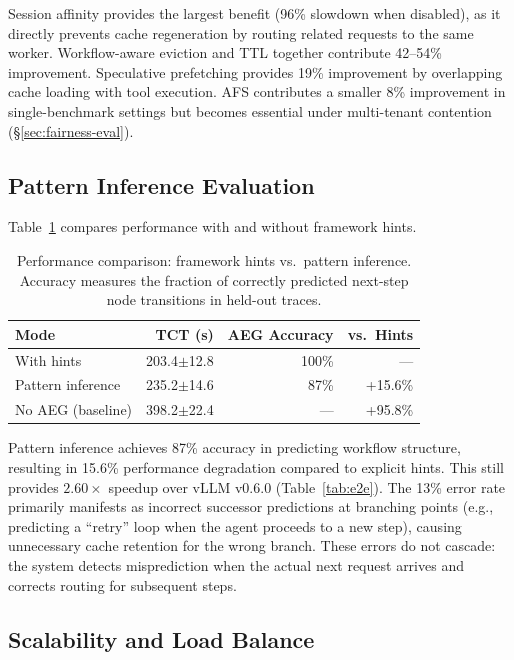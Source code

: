 \documentclass[sigconf]{acmart}
\begin{document}
Session affinity provides the largest benefit (96\% slowdown when disabled), as it directly prevents cache regeneration by routing related requests to the same worker. Workflow-aware eviction and TTL together contribute 42--54\% improvement. Speculative prefetching provides 19\% improvement by overlapping cache loading with tool execution. AFS contributes a smaller 8\% improvement in single-benchmark settings but becomes essential under multi-tenant contention (\S\ref{sec:fairness-eval}).

\subsection{Pattern Inference Evaluation}
\label{sec:eval-pattern}

Table~\ref{tab:pattern} compares performance with and without framework hints.

\begin{table}[t]
    \centering
    \caption{Performance comparison: framework hints vs.\ pattern inference. Accuracy measures the fraction of correctly predicted next-step node transitions in held-out traces.}
    \label{tab:pattern}
    \begin{tabular}{lrrr}
    \toprule
    \textbf{Mode} & \textbf{TCT (s)} & \textbf{AEG Accuracy} & \textbf{vs.\ Hints} \\
    \midrule
    With hints & 203.4\scriptsize{$\pm$12.8} & 100\% & --- \\
    Pattern inference & 235.2\scriptsize{$\pm$14.6} & 87\% & +15.6\% \\
    No AEG (baseline) & 398.2\scriptsize{$\pm$22.4} & --- & +95.8\% \\
    \bottomrule
    \end{tabular}
\end{table}

Pattern inference achieves 87\% accuracy in predicting workflow structure, resulting in 15.6\% performance degradation compared to explicit hints. This still provides $2.60\times$ speedup over vLLM v0.6.0 (Table~\ref{tab:e2e}). The 13\% error rate primarily manifests as incorrect successor predictions at branching points (e.g., predicting a ``retry'' loop when the agent proceeds to a new step), causing unnecessary cache retention for the wrong branch. These errors do not cascade: the system detects misprediction when the actual next request arrives and corrects routing for subsequent steps.

\subsection{Scalability and Load Balance}
\label{sec:scalability}
\end{document}

